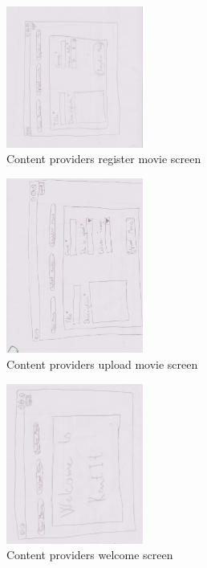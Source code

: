 \begin{figure}[!ht]
  \centering
    \includegraphics[angle=90, width=0.4\textwidth]{Parts/Appendix/Images/PaperMockup/CPRegisterMovie}
  \caption{Content providers register movie screen}
  \label{fig:Appendix_GUI_sketches_CPRegister}
\end{figure}
\begin{figure}[!ht]
  \centering
    \includegraphics[angle=90, width=0.4\textwidth]{Parts/Appendix/Images/PaperMockup/CPUploadmovie}
  \caption{Content providers upload movie screen}
  \label{fig:Appendix_GUI_sketches_CPUploadMovie}
\end{figure}
\begin{figure}[!ht]
  \centering
    \includegraphics[angle=90, width=0.4\textwidth]{Parts/Appendix/Images/PaperMockup/CPWelcome}
  \caption{Content providers welcome screen}
  \label{fig:Appendix_GUI_sketches_CPWelcome}
\end{figure}
